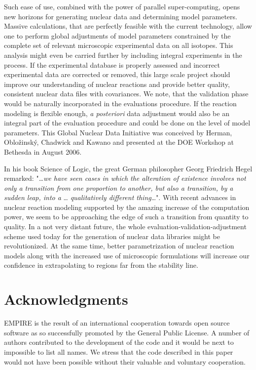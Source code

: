 Such ease of use, combined with the power of parallel super-computing, opens
new horizons for generating nuclear data and determining model parameters.
Massive calculations, that are perfectly feasible with the current
technology, allow one to perform global adjustments of model parameters
constrained by the complete set of relevant microscopic experimental data on
all isotopes. This analysis might even be carried further by including
integral experiments in the process. If the experimental database is properly
assessed and incorrect experimental data are corrected
or removed, this large scale
project should improve our understanding of nuclear reactions and provide
better quality, consistent nuclear data files with covariances. We note,
that the validation phase would be naturally incorporated in the evaluations
procedure. If the reaction modeling is flexible enough, \textit{a
posteriori} data adjustment would also be an integral part of the evaluation
procedure and could be done on the level of model parameters. This Global
Nuclear Data Initiative was conceived by Herman, Oblo\v zinsk\' y, Chadwick
and Kawano and presented at the DOE Workshop at Bethesda in August 2006.

In his book Science of Logic, the great German philosopher Georg Friedrich
Hegel remarked: "\ldots \textit{we have seen cases in which the alteration
of existence involves not only a transition from one proportion to another,
but also a transition, by a sudden leap, into a} \ldots \textit{%
qualitatively different thing}\ldots ". With recent advances in nuclear
reaction modeling supported by the amazing increase of the computation power,
we seem to be approaching the edge of such a transition from quantity to
quality. In a not very distant future, the whole
evaluation-validation-adjustment scheme used today
for the generation of nuclear
data libraries might be revolutionized. At the same time, better
parametrization of nuclear reaction models along with the increased use of
microscopic formulations will increase our confidence in extrapolating to
regions far from the stability line.

\section*{Acknowledgments}

EMPIRE is the result of an international cooperation towards open source
software as so successfully promoted by the General Public License. A number
of authors contributed to the development of the code and it would be next
to impossible to list all names. We stress that the code described in this
paper would not have been possible without their valuable and voluntary
cooperation.

